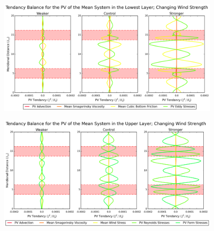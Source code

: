 \documentclass[12pt,a4paper]{report}
\begin{document}
  \begin{figure}
  	\centering
  	\includegraphics[width=\linewidth]{pvbalance_0_1}
  	\caption{ }
  	\label{pvbalance01}
  \end{figure}
  
  \begin{figure}
  	\centering
  	\includegraphics[width=\linewidth]{pvbalance_0_3}
  	\caption{ }
  	\label{pvbalance03}
  \end{figure}
  
\end{document}
